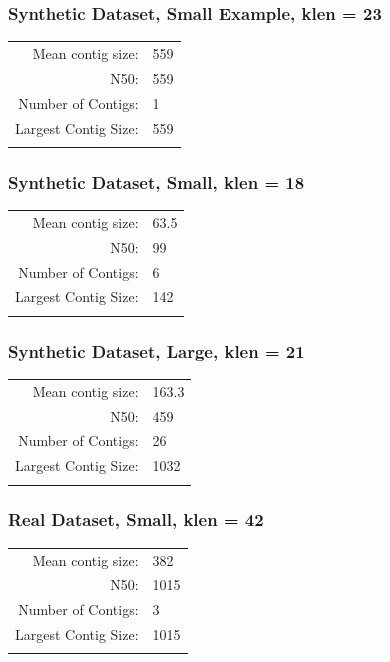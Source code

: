 \documentclass[12pt]{article}
\begin{document}
\begin{center}

\subsubsection*{Synthetic Dataset, Small Example, klen = 23}

\begin{tabular}{rl} \hline
Mean contig size: & 559 \\
N50: & 559 \\
Number of Contigs: & 1\\
Largest Contig Size: & 559\\
\label{table:synth_ex_small}
\end{tabular}

\subsubsection*{Synthetic Dataset, Small, klen = 18}

\begin{tabular}{rl} \hline
Mean contig size: & 63.5 \\
N50: & 99 \\
Number of Contigs: & 6\\
Largest Contig Size: & 142\\
\label{table:synth_small}
\end{tabular}

\subsubsection*{Synthetic Dataset, Large, klen = 21}

\begin{tabular}{rl} \hline
Mean contig size: & 163.3 \\
N50: & 459 \\
Number of Contigs: & 26\\
Largest Contig Size: & 1032\\
\label{table:synth_large}
\end{tabular}

\subsubsection*{Real Dataset, Small, klen = 42}

\begin{tabular}{rl} \hline
Mean contig size: & 382 \\
N50: & 1015 \\
Number of Contigs: & 3\\
Largest Contig Size: & 1015\\
\label{table:real_small}
\end{tabular}


\end{center}
\end{document}
